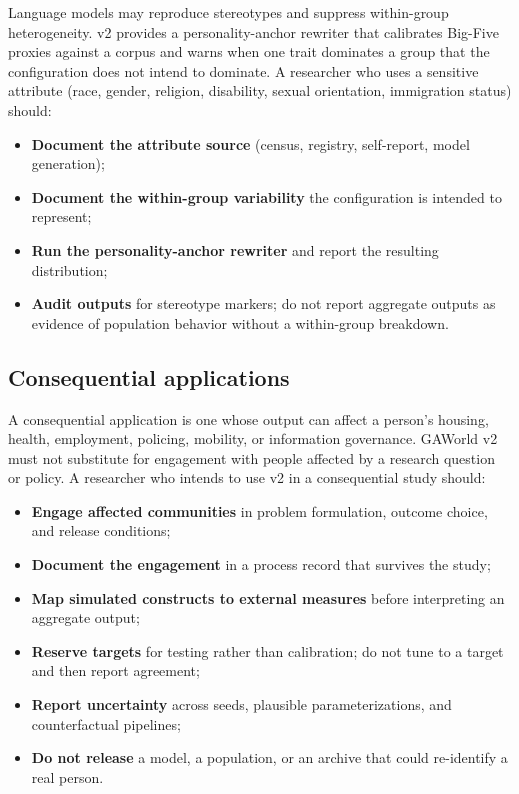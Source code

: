 Language models may reproduce stereotypes and suppress within-group
heterogeneity.  v2 provides a personality-anchor rewriter that
calibrates Big-Five proxies against a corpus and warns when one
trait dominates a group that the configuration does not intend to
dominate.  A researcher who uses a sensitive attribute (race,
gender, religion, disability, sexual orientation, immigration
status) should:

\begin{itemize}[leftmargin=*]
  \item \textbf{Document the attribute source} (census, registry,
  self-report, model generation);
  \item \textbf{Document the within-group variability} the
  configuration is intended to represent;
  \item \textbf{Run the personality-anchor rewriter} and report
  the resulting distribution;
  \item \textbf{Audit outputs} for stereotype markers; do not
  report aggregate outputs as evidence of population behavior
  without a within-group breakdown.
\end{itemize}

\subsection{Consequential applications}

A consequential application is one whose output can affect a
person's housing, health, employment, policing, mobility, or
information governance.  GAWorld v2 must not substitute for
engagement with people affected by a research question or policy.
A researcher who intends to use v2 in a consequential study should:

\begin{itemize}[leftmargin=*]
  \item \textbf{Engage affected communities} in problem
  formulation, outcome choice, and release conditions;
  \item \textbf{Document the engagement} in a process record that
  survives the study;
  \item \textbf{Map simulated constructs to external measures}
  before interpreting an aggregate output;
  \item \textbf{Reserve targets} for testing rather than
  calibration; do not tune to a target and then report agreement;
  \item \textbf{Report uncertainty} across seeds, plausible
  parameterizations, and counterfactual pipelines;
  \item \textbf{Do not release} a model, a population, or an
  archive that could re-identify a real person.
\end{itemize}

